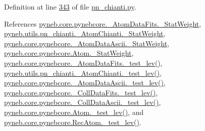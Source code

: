 Definition at line \hyperlink{pn__chianti_8py_source_l00343}{343} of file \hyperlink{pn__chianti_8py_source}{pn\-\_\-chianti.\-py}.



References \hyperlink{pynebcore_8py_source_l00102}{pyneb.\-core.\-pynebcore.\-\_\-\-Atom\-Data\-Fits.\-\_\-\-Stat\-Weight}, \hyperlink{pn__chianti_8py_source_l00286}{pyneb.\-utils.\-pn\-\_\-chianti.\-\_\-\-Atom\-Chianti.\-\_\-\-Stat\-Weight}, \hyperlink{pynebcore_8py_source_l00414}{pyneb.\-core.\-pynebcore.\-\_\-\-Atom\-Data\-Ascii.\-\_\-\-Stat\-Weight}, \hyperlink{pynebcore_8py_source_l01321}{pyneb.\-core.\-pynebcore.\-Atom.\-\_\-\-Stat\-Weight}, \hyperlink{pynebcore_8py_source_l00178}{pyneb.\-core.\-pynebcore.\-\_\-\-Atom\-Data\-Fits.\-\_\-test\-\_\-lev()}, \hyperlink{pn__chianti_8py_source_l00304}{pyneb.\-utils.\-pn\-\_\-chianti.\-\_\-\-Atom\-Chianti.\-\_\-test\-\_\-lev()}, \hyperlink{pynebcore_8py_source_l00447}{pyneb.\-core.\-pynebcore.\-\_\-\-Atom\-Data\-Ascii.\-\_\-test\-\_\-lev()}, \hyperlink{pynebcore_8py_source_l00677}{pyneb.\-core.\-pynebcore.\-\_\-\-Coll\-Data\-Fits.\-\_\-test\-\_\-lev()}, \hyperlink{pynebcore_8py_source_l01045}{pyneb.\-core.\-pynebcore.\-\_\-\-Coll\-Data\-Ascii.\-\_\-test\-\_\-lev()}, \hyperlink{pynebcore_8py_source_l01525}{pyneb.\-core.\-pynebcore.\-Atom.\-\_\-test\-\_\-lev()}, and \hyperlink{pynebcore_8py_source_l02672}{pyneb.\-core.\-pynebcore.\-Rec\-Atom.\-\_\-test\-\_\-lev()}.


